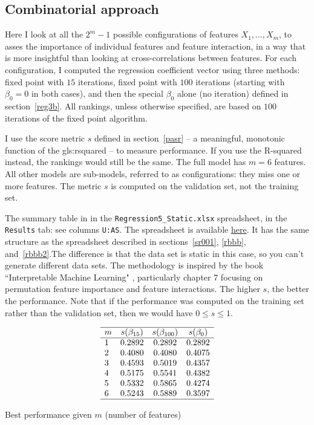 \documentclass[oneside,10pt]{book}
\begin{document}
\subsection{Combinatorial approach} \label{combor1}

Here I look at all the  $2^m - 1$ possible configurations of features $X_1,\dots,X_m$, to asses the importance of individual features and feature interaction, in a way that is more insightful than looking at cross-correlations between features. For each configuration, I computed the regression coefficient vector using three methods: fixed point with $15$ iterations, fixed point with $100$ iterations (starting with $\beta_0=0$ in both cases), and then the special $\beta_0$ alone (no iteration) defined
in section~\ref{reg3b}. All rankings, unless otherwise specified, are based on  $100$ iterations of the fixed point algorithm.

I use the score metric $s$ defined in section~\ref{pasr} -- a meaningful, monotonic function of the \gls{gls:rsquared} -- to measure performance. If you use the R-squared instead, the rankings would still be the same. The full model has $m=6$ features. All other models are sub-models, referred to as configurations: they miss one or more features. The metric $s$ is computed on the validation set, not the training set.

The summary table in in the \texttt{Regression5\_Static.xlsx} spreadsheet, in the \texttt{Results} tab: see columns \texttt{U:AS}.
The spreadsheet is available \href{https://github.com/VincentGranville/Machine-Learning/blob/main/Spreadsheets/README.md}{here}. It has the same structure as the spreadsheet described in sections~\ref{sr001}, \ref{rbbb}, and~\ref{rbbb2}.The difference is that the data set is static in this case, so you can't generate different data sets. The methodology is inspired by the book ``Interpretable Machine Learning" \cite{cmol}, particularly chapter 7 focusing on permutation feature importance and feature interactions. The higher $s$, the better the performance. Note that if the performance was computed on the training set rather than the validation set, then we would have $0\leq s\leq 1$.



\begin{table}%
\[
\begin{array}{lccc}
\hline
 m &  s(\beta_{15}) & s(\beta_{100}) & s(\beta_0)  \\
\hline
1 & 0.2892 &	0.2892 &	0.2892\\
2 &	0.4080 &	0.4080 &	0.4075\\
3 &	0.4593 &	0.5019 &	0.4357\\
4 &	0.5175 &	0.5541 &	0.4382\\
5 &	0.5332 &	0.5865 &	0.4274\\
6 &	0.5243 &	0.5889 &	0.3597\\
\hline
\end{array}
\]
\caption{\label{tabrr123}Best performance given $m$ (number of features)}
\end{table}
\end{document}
